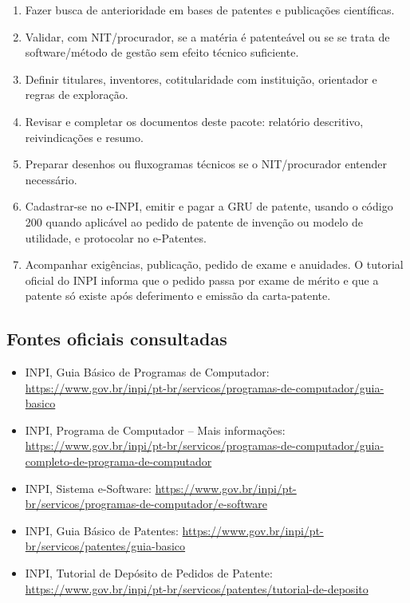 \begin{enumerate}
  \item Fazer busca de anterioridade em bases de patentes e publicações científicas.
  \item Validar, com NIT/procurador, se a matéria é patenteável ou se se trata de software/método de gestão sem efeito técnico suficiente.
  \item Definir titulares, inventores, cotitularidade com instituição, orientador e regras de exploração.
  \item Revisar e completar os documentos deste pacote: relatório descritivo, reivindicações e resumo.
  \item Preparar desenhos ou fluxogramas técnicos se o NIT/procurador entender necessário.
  \item Cadastrar-se no e-INPI, emitir e pagar a GRU de patente, usando o código 200 quando aplicável ao pedido de patente de invenção ou modelo de utilidade, e protocolar no e-Patentes.
  \item Acompanhar exigências, publicação, pedido de exame e anuidades. O tutorial oficial do INPI informa que o pedido passa por exame de mérito e que a patente só existe após deferimento e emissão da carta-patente.
\end{enumerate}

\subsection{Fontes oficiais consultadas}

\begin{itemize}
  \item INPI, Guia Básico de Programas de Computador: \url{https://www.gov.br/inpi/pt-br/servicos/programas-de-computador/guia-basico}
  \item INPI, Programa de Computador -- Mais informações: \url{https://www.gov.br/inpi/pt-br/servicos/programas-de-computador/guia-completo-de-programa-de-computador}
  \item INPI, Sistema e-Software: \url{https://www.gov.br/inpi/pt-br/servicos/programas-de-computador/e-software}
  \item INPI, Guia Básico de Patentes: \url{https://www.gov.br/inpi/pt-br/servicos/patentes/guia-basico}
  \item INPI, Tutorial de Depósito de Pedidos de Patente: \url{https://www.gov.br/inpi/pt-br/servicos/patentes/tutorial-de-deposito}
\end{itemize}
